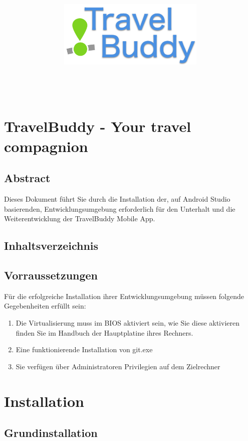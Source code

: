 \documentclass[a4paper,10pt,xetex]{article}
\title{
  \includegraphics[width=7cm]{travel-buddy_white}\\[\bigskipamount]
  \documenttitle\\[\bigskipamount]
}
\author{\documentauthors}
\date{\parbox{\linewidth}{\centering%
  IT15TA ZH \hspace*{3cm} Gruppe 3\endgraf\bigskip
  Dokumentversion \documentversion, \documentdate\endgraf
}}
\begin{document}
\maketitle\newpage

%

\section{TravelBuddy - Your travel compagnion}

\subsection{Abstract}
Dieses Dokument führt Sie durch die Installation der, auf Android Studio basierenden, Entwicklungsumgebung erforderlich für den Unterhalt und die Weiterentwicklung der TravelBuddy Mobile App.

\subsection{Inhaltsverzeichnis}
\subsection{Vorraussetzungen}
Für die erfolgreiche Installation ihrer Entwicklungsumgebung müssen folgende Gegebenheiten erfüllt sein:
\begin{enumerate}
  \item Die Virtualisierung muss im BIOS aktiviert sein, wie Sie diese aktivieren finden Sie im Handbuch der Hauptplatine ihres Rechners.
  \item Eine funktionierende Installation von git.exe
  \item Sie verfügen über Administratoren Privilegien auf dem Zielrechner
\end{enumerate}

\section{Installation}
\subsection{Grundinstallation}
\end{document}
